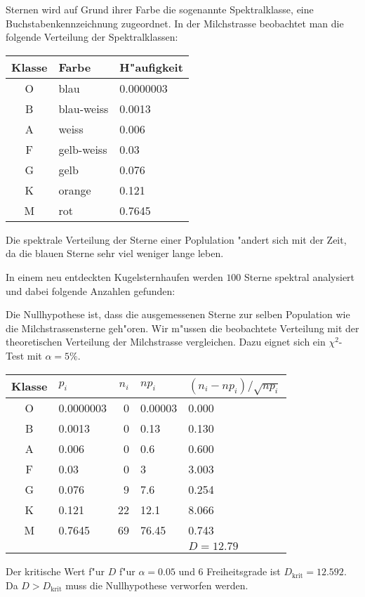 Sternen wird auf Grund ihrer Farbe die sogenannte Spektralklasse,
eine Buchstabenkennzeichnung zugeordnet.
In der Milchstrasse beobachtet man die folgende Verteilung
der Spektralklassen:
\begin{center}
\begin{tabular}{|c|l|l|}
\hline
Klasse&Farbe     &H"aufigkeit\\
\hline
O     &blau      &0.0000003\\
B     &blau-weiss&0.0013\\
A     &weiss     &0.006\\
F     &gelb-weiss&0.03\\
G     &gelb      &0.076\\
K     &orange    &0.121\\
M     &rot       &0.7645\\
\hline
\end{tabular}
\end{center}
Die spektrale Verteilung der Sterne einer Poplulation "andert sich mit der
Zeit, da die blauen Sterne sehr viel weniger lange leben.

In einem neu entdeckten Kugelsternhaufen werden $100$ Sterne spektral
analysiert und dabei folgende Anzahlen gefunden:

\begin{loesung}
Die Nullhypothese ist, dass die ausgemessenen Sterne zur selben
Population wie die Milchstrassensterne geh"oren.
Wir m"ussen die beobachtete Verteilung mit der theoretischen Verteilung
der Milchstrasse vergleichen.
Dazu eignet sich ein $\chi^2$-Test mit $\alpha=5\%$.
\begin{center}
\begin{tabular}{|c|l|r|l|l|}
\hline
Klasse&$p_i$    &$n_i$&$np_i$            &$(n_i-np_i)/\sqrt{np_i}$\\
\hline
   O  &0.0000003&    0&\phantom{0}0.00003& 0.000\phantom{03003603}\\
   B  &0.0013   &    0&\phantom{0}0.13   & 0.130\phantom{1561    }\\
   A  &0.006    &    0&\phantom{0}0.6    & 0.600\phantom{7207    }\\
   F  &0.03     &    0&\phantom{0}3      & 3.003\phantom{603     }\\
   G  &0.076    &    9&\phantom{0}7.6    & 0.254\phantom{2371    }\\
   K  &0.121    &   22&12.1              & 8.066\phantom{546     }\\
   M  &0.7645   &   69&76.45             & 0.743\phantom{1121    }\\
\hline
      &         &     &                  &$D=12.79$\\
\hline
\end{tabular}
\end{center}
Der kritische Wert f"ur $D$ f"ur $\alpha = 0.05$ und $6$ Freiheitsgrade
ist $D_{\text{krit}}=12.592$. 
Da $D>D_{\text{krit}}$ muss die Nullhypothese verworfen werden.
\end{loesung}

